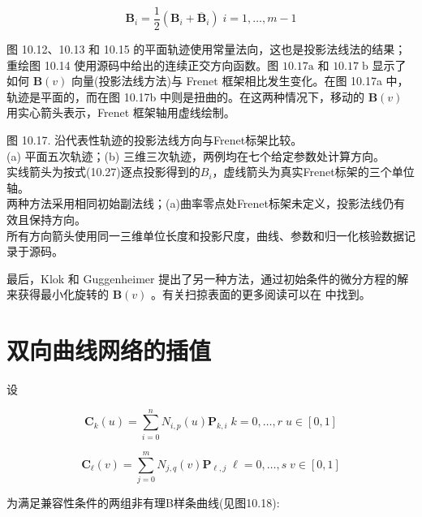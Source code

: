 \documentclass[../main.tex]{subfiles}
\begin{document}
\[
{\mathbf{B}}_{i} = \frac{1}{2}\left( {{\mathbf{B}}_{i} + {\overline{\mathbf{B}}}_{i}}\right) \;i = 1,\ldots ,m - 1
\]

图 10.12、10.13 和 10.15 的平面轨迹使用常量法向，这也是投影法线法的结果；重绘图 10.14 使用源码中给出的连续正交方向函数。图 \({10.17}\mathrm{a}\) 和 \({10.17}\mathrm{\;b}\) 显示了如何 \(\mathbf{B}\left( v\right)\) 向量(投影法线方法)与 Frenet 框架相比发生变化。在图 10.17a 中，轨迹是平面的，而在图 10.17b 中则是扭曲的。在这两种情况下，移动的 \(\mathbf{B}\left( v\right)\) 用实心箭头表示，Frenet 框架轴用虚线绘制。

\begin{center}
\begin{minipage}{26cm}
\vspace*{.6\baselineskip}
\centering
{}
\par\smallskip
图 10.17. 沿代表性轨迹的投影法线方向与Frenet标架比较。\\
(a) 平面五次轨迹；(b) 三维三次轨迹，两例均在七个给定参数处计算方向。\\
实线箭头为按式(10.27)逐点投影得到的$B_i$，虚线箭头为真实Frenet标架的三个单位轴。\\
两种方法采用相同初始副法线；(a)曲率零点处Frenet标架未定义，投影法线仍有效且保持方向。\\
所有方向箭头使用同一三维单位长度和投影尺度，曲线、参数和归一化核验数据记录于源码。
\end{minipage}
\end{center}

最后，Klok \cite{Klok86} 和 Guggenheimer \cite{Gugg89} 提出了另一种方法，通过初始条件的微分方程的解来获得最小化旋转的 \(\mathbf{B}\left( v\right)\) 。有关扫掠表面的更多阅读可以在 \cite{Choi90,Akma92} 中找到。


\section{双向曲线网络的插值}
设

\[
{\mathbf{C}}_{k}\left( u\right)  = \mathop{\sum }\limits_{{i = 0}}^{n}{N}_{i,p}\left( u\right) {\mathbf{P}}_{k,i}\;k = 0,\ldots ,r\;u \in  \left\lbrack  {0,1}\right\rbrack
\]

\[
{\mathbf{C}}_{\ell }\left( v\right)  = \mathop{\sum }\limits_{{j = 0}}^{m}{N}_{j,q}\left( v\right) {\mathbf{P}}_{\ell ,j}\;\ell  = 0,\ldots ,s\;v \in  \left\lbrack  {0,1}\right\rbrack   \tag{10.28}
\]

为满足兼容性条件的两组非有理B样条曲线(见图10.18):
\end{document}
